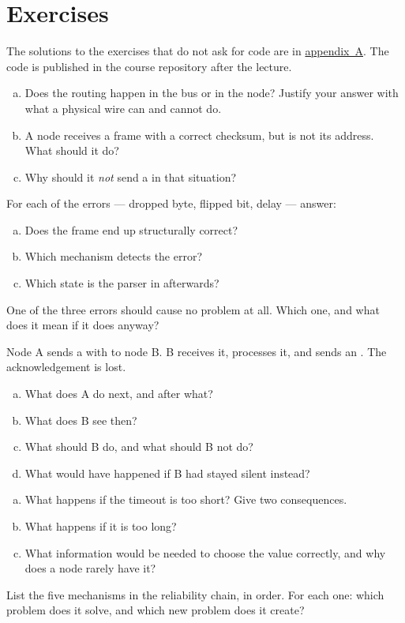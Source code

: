 \section*{Exercises}

The solutions to the exercises that do not ask for code are in
\hyperref[ch:losningar]{appendix~A}. The code is published in the course repository after the
lecture.

\label{ex:3:1}
\begin{enumerate}[a)]
  \item Does the routing happen in the bus or in the node? Justify your answer with what a
    physical wire can and cannot do.
  \item A node receives a frame with a correct checksum, but  is not its address. What
    should it do?
  \item Why should it \emph{not} send a  in that situation?
\end{enumerate}

\label{ex:3:2}
For each of the errors --- dropped byte, flipped bit, delay --- answer:
\begin{enumerate}[a)]
  \item Does the frame end up structurally correct?
  \item Which mechanism detects the error?
  \item Which state is the parser in afterwards?
\end{enumerate}
One of the three errors should cause no problem at all. Which one, and what does it mean if it
does anyway?

\label{ex:3:3}
Node A sends a  with  to node B. B receives it, processes it,
and sends an . The acknowledgement is lost.
\begin{enumerate}[a)]
  \item What does A do next, and after what?
  \item What does B see then?
  \item What should B do, and what should B not do?
  \item What would have happened if B had stayed silent instead?
\end{enumerate}

\label{ex:3:4}
\begin{enumerate}[a)]
  \item What happens if the timeout is too short? Give two consequences.
  \item What happens if it is too long?
  \item What information would be needed to choose the value correctly, and why does a node
    rarely have it?
\end{enumerate}

\label{ex:3:5}
List the five mechanisms in the reliability chain, in order. For each one: which problem does it
solve, and which new problem does it create?
